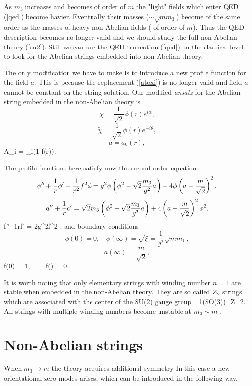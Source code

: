 \documentclass[12pt,epsf]{article}
\begin{document}
As $m_3$ increases and becomes of order of $m$ the "light" fields which
enter QED (\ref{qed}) become havier.  Eventually their masses ($\sim
\sqrt{mm_3}$) become of the same order as the masses of heavy
non-Abelian fields ( of order of $m$).  Thus the QED
description becomes no longer valid and we should study the full
non-Abelian theory (\ref{su2}). Still we can use the QED truncation
(\ref{qed}) on the classical level to look for the Abelian strings
embedded into non-Abelian theory.

The only modification we have to make is to introduce a new profile
function for the field $a$. This is because the replacement
(\ref{atoxi})
is no longer valid and field $a$ cannot be constant on the string
solution. Our modified {\em ansatz} for the Abelian string
embedded in the non-Abelian theory is
$$
\chi = \frac1{\sqrt{2}}\phi(r)e^{i\alpha},
$$
$$
\tilde\chi = \frac1{\sqrt{2}}\phi(r)e^{-i\theta},
$$
$$
a=a_0(r),
$$
\beq
\label{str}
A_i = \pt_i\alpha\left(1-f(r)\right).
\eeq

The profile functions here satisfy now the second order equations
$$
\phi''+{1\over r}\phi'-{1\over r^2}f^2\phi =
g^2\phi\left(\phi^2-\sqrt{2}\frac{m_3}{g^2} a\right)+4\phi\left(a-
\frac{m}{\sqrt{2}}\right)^2 ,
$$
$$
a''+ {1\over r}a' = \sqrt{2}m_3\left(
\phi^2-\sqrt{2}\frac{m_3}{g^2} a\right)
+4\left(a-\frac{m}{\sqrt{2}}\right)^2 \phi^2,
$$
\beq \label{streq}
f''- {1\over r}f' = 2g^2f\phi^2 .
\eeq
and boundary conditions
$$
\phi(0) = 0, \ \ \ \ \phi(\infty) = \sqrt{\xi}=\frac1{g^2}\sqrt{
mm_3},
$$
$$
a(\infty) = \frac{m}{\sqrt{2}},
$$
\beq
f(0) = 1, \ \ \ \ f(\infty) = 0.
\label{bc}
\eeq

It is worth noting that only elementary strings with winding number
$n=1$ are stable when embedded in the non-Abelian theory. They are
so called $Z_2$ strings which are associated with the center of the
SU(2) gauge group
 \beq \pi_1(SO(3))=Z_2.
\label{top}
\eeq
All strings with multiple winding numbers become unstable
at $m_3\sim m$ \cite{SYmeta}.




\section{Non-Abelian strings}

When $m_3\rightarrow m$ the theory acquires additional symmetry
In this
case a new orientational zero
modes arises, which can be introduced in the
following way.
\end{document}
